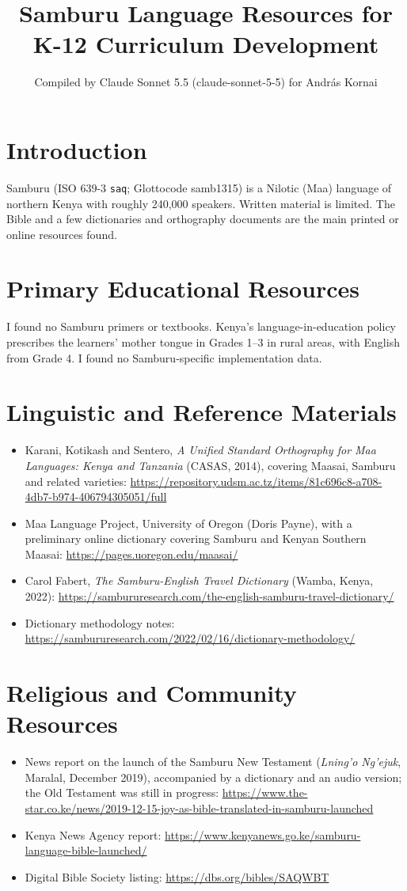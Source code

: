 \documentclass[12pt]{article}
\title{Samburu Language Resources for K-12 Curriculum Development}
\author{Compiled by Claude Sonnet 5.5 (claude-sonnet-5-5) for Andr\'as Kornai}
\date{}
\begin{document}
\maketitle

\section{Introduction}
Samburu (ISO 639-3 \texttt{saq}; Glottocode samb1315) is a Nilotic (Maa) language of northern Kenya with roughly 240,000 speakers. Written material is limited. The Bible and a few dictionaries and orthography documents are the main printed or online resources found.

\section{Primary Educational Resources}
I found no Samburu primers or textbooks. Kenya's language-in-education policy prescribes the learners' mother tongue in Grades 1--3 in rural areas, with English from Grade 4. I found no Samburu-specific implementation data.

\section{Linguistic and Reference Materials}
\begin{itemize}
\item Karani, Kotikash and Sentero, \emph{A Unified Standard Orthography for Maa Languages: Kenya and Tanzania} (CASAS, 2014), covering Maasai, Samburu and related varieties: \url{https://repository.udsm.ac.tz/items/81c696c8-a708-4db7-b974-406794305051/full}
\item Maa Language Project, University of Oregon (Doris Payne), with a preliminary online dictionary covering Samburu and Kenyan Southern Maasai: \url{https://pages.uoregon.edu/maasai/}
\item Carol Fabert, \emph{The Samburu-English Travel Dictionary} (Wamba, Kenya, 2022): \url{https://sambururesearch.com/the-english-samburu-travel-dictionary/}
\item Dictionary methodology notes: \url{https://sambururesearch.com/2022/02/16/dictionary-methodology/}
\end{itemize}

\section{Religious and Community Resources}
\begin{itemize}
\item News report on the launch of the Samburu New Testament (\emph{Lning'o Ng'ejuk}, Maralal, December 2019), accompanied by a dictionary and an audio version; the Old Testament was still in progress: \url{https://www.the-star.co.ke/news/2019-12-15-joy-as-bible-translated-in-samburu-launched}
\item Kenya News Agency report: \url{https://www.kenyanews.go.ke/samburu-language-bible-launched/}
\item Digital Bible Society listing: \url{https://dbs.org/bibles/SAQWBT}
\end{itemize}
\end{document}
